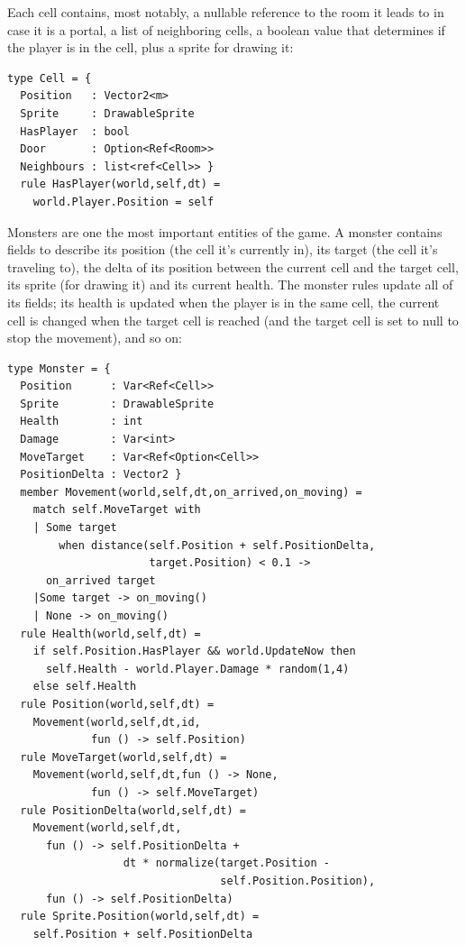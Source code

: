 Each cell contains, most notably, a nullable reference to the room it leads to in case it is a portal, a list of neighboring cells, a boolean value that determines if the player is in the cell, plus a sprite for drawing it:

\begin{lstlisting}
type Cell = { 
  Position   : Vector2<m> 
  Sprite     : DrawableSprite 
  HasPlayer  : bool
  Door       : Option<Ref<Room>> 
  Neighbours : list<ref<Cell>> } 
  rule HasPlayer(world,self,dt) = 
    world.Player.Position = self 
\end{lstlisting}

Monsters are one the most important entities of the game. A monster contains fields to describe its position (the cell it’s currently in), its target (the cell it’s traveling to), the delta of its position between the current cell and the target cell, its sprite (for drawing it) and its current health. The monster rules update all of its fields; its health is updated when the player is in the same cell, the current cell is changed when the target cell is reached (and the target cell is set to null to stop the movement), and so on:

\begin{lstlisting}
type Monster = { 
  Position      : Var<Ref<Cell>> 
  Sprite        : DrawableSprite
  Health        : int
  Damage        : Var<int> 
  MoveTarget    : Var<Ref<Option<Cell>> 
  PositionDelta : Vector2 } 
  member Movement(world,self,dt,on_arrived,on_moving) = 
    match self.MoveTarget with 
    | Some target 
        when distance(self.Position + self.PositionDelta, 
                      target.Position) < 0.1 -> 
      on_arrived target 
    |Some target -> on_moving() 
    | None -> on_moving() 
  rule Health(world,self,dt) = 
    if self.Position.HasPlayer && world.UpdateNow then 
      self.Health - world.Player.Damage * random(1,4) 
    else self.Health 
  rule Position(world,self,dt) = 
    Movement(world,self,dt,id,
             fun () -> self.Position) 
  rule MoveTarget(world,self,dt) = 
    Movement(world,self,dt,fun () -> None,
             fun () -> self.MoveTarget)   
  rule PositionDelta(world,self,dt) = 
    Movement(world,self,dt, 
      fun () -> self.PositionDelta + 
                  dt * normalize(target.Position - 
                                 self.Position.Position), 
      fun () -> self.PositionDelta) 
  rule Sprite.Position(world,self,dt) = 
    self.Position + self.PositionDelta
\end{lstlisting}

